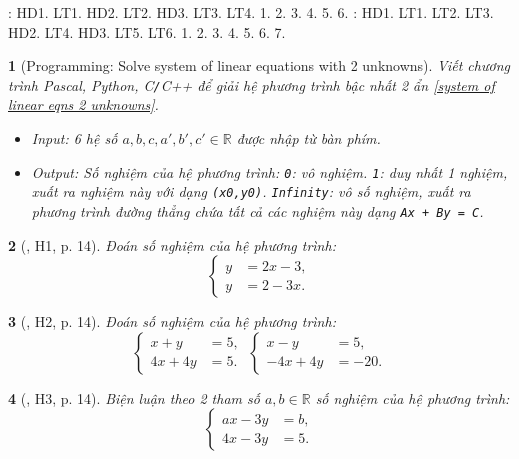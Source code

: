 \documentclass{article}
\newtheorem{baitoan}{}
\begin{document}
\noindent\cite[\S2, pp. 12--18]{SGK_Toan_9_Canh_Dieu_tap_1}: HD1. LT1. HD2. LT2. HD3. LT3. LT4. 1. 2. 3. 4. 5. 6. \cite[\S3, pp. 19--25]{SGK_Toan_9_Canh_Dieu_tap_1}: HD1. LT1. LT2. LT3. HD2. LT4. HD3. LT5. LT6. 1. 2. 3. 4. 5. 6. 7.

\begin{baitoan}[{\sf Programming}: Solve system of linear equations with 2 unknowns]
	Viết chương trình {\sf Pascal, Python, C{\tt/}C++} để giải hệ phương trình bậc nhất 2 ẩn \eqref{system of linear eqns 2 unknowns}.
	\begin{itemize}
		\item {\sf Input}: 6 hệ số $a,b,c,a',b',c'\in\mathbb{R}$ được nhập từ bàn phím.
		\item {\sf Output}: Số nghiệm của hệ phương trình: {\tt0}: vô nghiệm. {\tt1}: duy nhất 1 nghiệm, xuất ra nghiệm này với dạng {\tt(x0,y0)}. {\tt Infinity}: vô số nghiệm, xuất ra phương trình đường thẳng chứa tất cả các nghiệm này dạng {\tt Ax + By = C}.
	\end{itemize}
\end{baitoan}

\begin{baitoan}[\cite{Binh_boi_duong_Toan_9_tap_2}, H1, p. 14]
	Đoán số nghiệm của hệ phương trình:
	\begin{equation*}
		\left\{\begin{split}
			y &= 2x - 3,\\
			y &= 2 - 3x.
		\end{split}\right.
	\end{equation*}
\end{baitoan}

\begin{baitoan}[\cite{Binh_boi_duong_Toan_9_tap_2}, H2, p. 14]
	Đoán số nghiệm của hệ phương trình:
	\begin{equation*}
		\left\{\begin{split}
			x + y &= 5,\\
			4x + 4y &= 5.
		\end{split}\right.\ 
		\left\{\begin{split}
			x - y &= 5,\\
			-4x + 4y &= -20.
		\end{split}\right.
	\end{equation*}
\end{baitoan}

\begin{baitoan}[\cite{Binh_boi_duong_Toan_9_tap_2}, H3, p. 14]
	Biện luận theo 2 tham số $a,b\in\mathbb{R}$ số nghiệm của hệ phương trình:
	\begin{equation*}
		\left\{\begin{split}
			ax - 3y &= b,\\
			4x - 3y &= 5.
		\end{split}\right.
	\end{equation*}
\end{baitoan}
\end{document}
